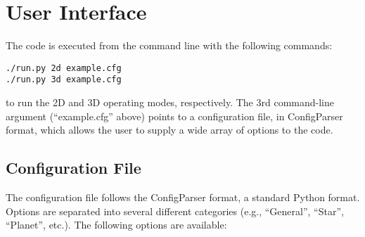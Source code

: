 \documentclass[12pt]{article}
\begin{document}
\section{User Interface}

The code is executed from the command line with the following commands:

\begin{verbatim}
./run.py 2d example.cfg
./run.py 3d example.cfg
\end{verbatim}

\noindent
to run the 2D and 3D operating modes, respectively. The 3rd command-line
argument (``example.cfg'' above) points to a configuration file, in
ConfigParser format, which allows the user to supply a wide array
of options to the code.

\subsection{Configuration File}

The configuration file follows the ConfigParser format, a standard
Python format. Options are separated into several different categories
(e.g., ``General'', ``Star'', ``Planet'', etc.). The following options
are available:
\end{document}

